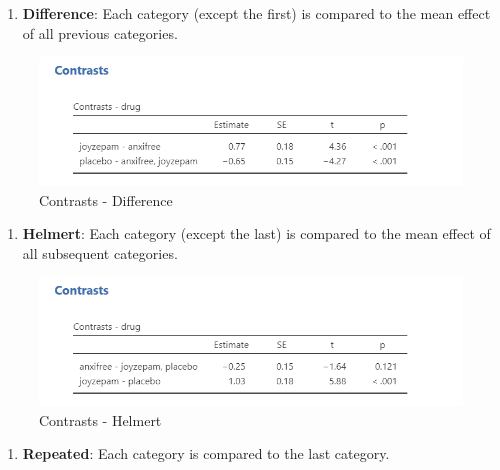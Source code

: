 \documentclass[
]{book}
\providecommand{\tightlist}{%
  \setlength{\itemsep}{0pt}\setlength{\parskip}{0pt}}
\begin{document}
\begin{enumerate}
\def\labelenumi{\arabic{enumi}.}
\setcounter{enumi}{2}
\tightlist
\item
  \textbf{Difference}: Each category (except the first) is compared to the mean effect of all previous categories.
\end{enumerate}

\begin{figure}

{\centering \includegraphics[width=1\linewidth]{images/04_one-way-anova/contrasts_difference} 

}

\caption{Contrasts - Difference}\label{fig:unnamed-chunk-3}
\end{figure}

\begin{enumerate}
\def\labelenumi{\arabic{enumi}.}
\setcounter{enumi}{3}
\tightlist
\item
  \textbf{Helmert}: Each category (except the last) is compared to the mean effect of all subsequent categories.
\end{enumerate}

\begin{figure}

{\centering \includegraphics[width=1\linewidth]{images/04_one-way-anova/contrasts_helmert} 

}

\caption{Contrasts - Helmert}\label{fig:unnamed-chunk-4}
\end{figure}

\begin{enumerate}
\def\labelenumi{\arabic{enumi}.}
\setcounter{enumi}{4}
\tightlist
\item
  \textbf{Repeated}: Each category is compared to the last category.
\end{enumerate}
\end{document}
